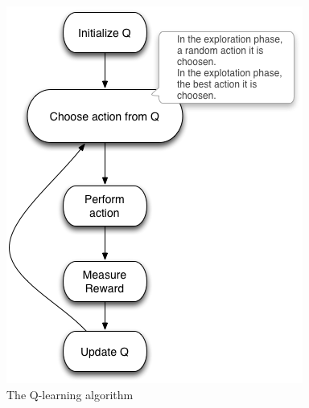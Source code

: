 \documentclass{bmcart}
\begin{document}
\begin{backmatter}
\begin{figure}
\centering
\includegraphics{./images/qalgo.png}
\caption{The Q-learning algorithm}
\label{fig:qalgo}
\end{figure}



\end{backmatter}
\end{document}
